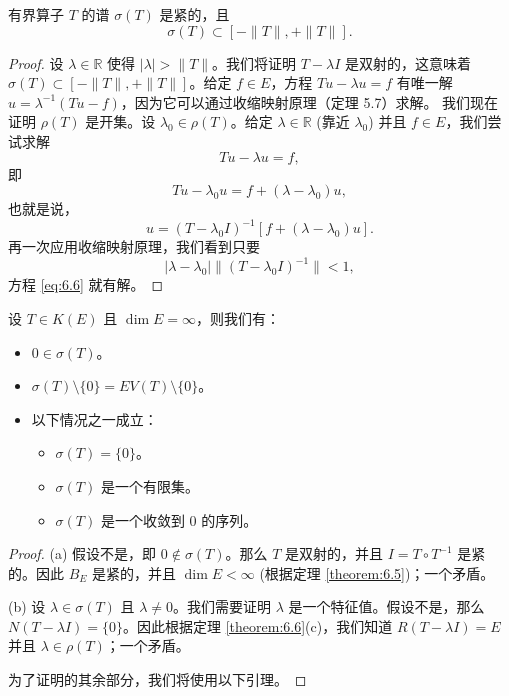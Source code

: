\begin{proposition}\label{proposition:6.7}
有界算子 \(T\) 的谱 \(\sigma(T)\) 是紧的，且
\[
\sigma(T) \subset [- \|T\|, + \|T\|].
\]
\end{proposition}

\begin{proof}
设 \(\lambda \in \mathbb{R}\) 使得 \(|\lambda| > \|T\|\)。我们将证明 \(T-\lambda I\) 是双射的，这意味着 \(\sigma(T) \subset [-\|T\|, +\|T\|]\)。给定 \(f \in E\)，方程 \(Tu-\lambda u = f\) 有唯一解 \(u = \lambda^{-1}(Tu-f)\)，因为它可以通过收缩映射原理（定理 5.7）求解。
我们现在证明 \(\rho(T)\) 是开集。设 \(\lambda_0 \in \rho(T)\)。给定 \(\lambda \in \mathbb{R}\) (靠近 \(\lambda_0\)) 并且 \(f \in E\)，我们尝试求解
\begin{equation}\label{eq:6.5}
Tu - \lambda u = f,
\end{equation}
即
\[
Tu - \lambda_0 u = f + (\lambda - \lambda_0)u,
\]
也就是说，
\begin{equation}\label{eq:6.6}
u = (T - \lambda_0 I)^{-1}[f + (\lambda - \lambda_0)u].
\end{equation}
再一次应用收缩映射原理，我们看到只要
\[
|\lambda - \lambda_0| \|(T - \lambda_0 I)^{-1}\| < 1,
\]
方程 \eqref{eq:6.6} 就有解。
\end{proof}

\begin{theorem}\label{theorem:6.8}
设 \(T \in K(E)\) 且 \(\dim E = \infty\)，则我们有：
\begin{itemize}
    \item[(a)] \(0 \in \sigma(T)\)。
    \item[(b)] \(\sigma(T) \setminus \{0\} = EV(T) \setminus \{0\}\)。
    \item[(c)] 以下情况之一成立：
    \begin{itemize}
        \item \(\sigma(T) = \{0\}\)。
        \item \(\sigma(T)\) 是一个有限集。
        \item \(\sigma(T)\) 是一个收敛到 0 的序列。
    \end{itemize}
\end{itemize}
\end{theorem}

\begin{proof}
(a) 假设不是，即 \(0 \notin \sigma(T)\)。那么 \(T\) 是双射的，并且 \(I = T \circ T^{-1}\) 是紧的。因此 \(B_E\) 是紧的，并且 \(\dim E < \infty\) (根据定理 \ref{theorem:6.5})；一个矛盾。

(b) 设 \(\lambda \in \sigma(T)\) 且 \(\lambda \ne 0\)。我们需要证明 \(\lambda\) 是一个特征值。假设不是，那么 \(N(T - \lambda I) = \{0\}\)。因此根据定理 \ref{theorem:6.6}(c)，我们知道 \(R(T - \lambda I) = E\) 并且 \(\lambda \in \rho(T)\)；一个矛盾。

为了证明的其余部分，我们将使用以下引理。
\end{proof}

